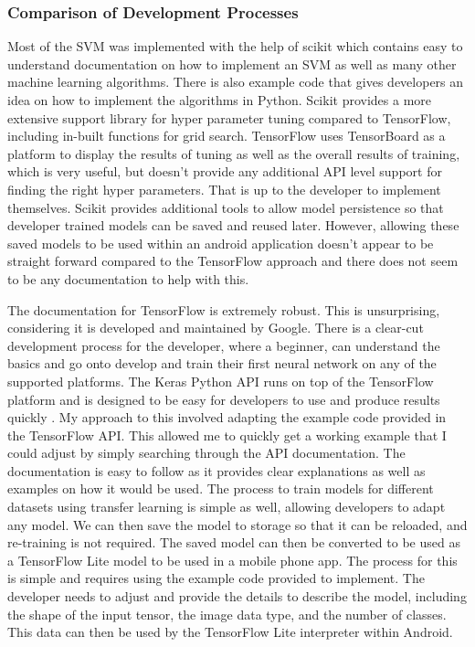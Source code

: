 \documentclass[12pt,a4paper]{report}
\begin{document}
\subsubsection{Comparison of Development Processes}
Most of the SVM was implemented with the help of scikit which contains easy to understand documentation on how to 
implement an SVM as well as many other machine learning algorithms. There is also example code that gives developers an 
idea on how to implement the algorithms in Python. Scikit provides a more extensive support library for hyper parameter 
tuning compared to TensorFlow, including in-built functions for grid search. TensorFlow uses TensorBoard as a platform 
to display the results of tuning as well as the overall results of training, which is very useful, but doesn't provide 
any additional API level support for finding the right hyper parameters. That is up to the developer to implement 
themselves. Scikit provides additional tools to allow model persistence so that developer trained models can be saved 
and reused later. However, allowing these saved models to be used within an android application doesn't appear to be 
straight forward compared to the TensorFlow approach and there does not seem to be any documentation to help with this. 

\par

The documentation for TensorFlow is extremely robust. This is unsurprising, considering it is developed and maintained 
by Google. There is a clear-cut development process for the developer, where a beginner, can understand the basics and 
go onto develop and train their first neural network on any of the supported platforms. The Keras Python API runs on 
top of the TensorFlow platform and is designed to be easy for developers to use and produce results quickly 
\citep{kerasabout}. My approach to this involved adapting the example code provided in the TensorFlow API. This allowed
me to quickly get a working example that I could adjust by simply searching through the API documentation. The 
documentation is easy to follow as it provides clear explanations as well as examples on how it would be used. The 
process to train models for different datasets using transfer learning is simple as well, allowing developers to adapt 
any model. We can then save the model to storage so that it can be reloaded, and re-training is not required. The saved 
model can then be converted to be used as a TensorFlow Lite model to be used in a mobile phone app. The process for this
is simple and requires using the example code provided to implement. The developer needs to adjust and provide the 
details to describe the model, including the shape of the input tensor, the image data type, and the number of classes. 
This data can then be used by the TensorFlow Lite interpreter within Android.
\end{document}

